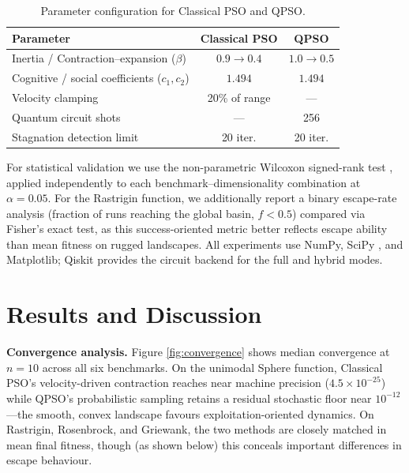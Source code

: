 \documentclass[11pt]{article}
\begin{document}
\begin{table}[h]
\centering
\small
\vspace{-0.3em}
\begin{tabular}{lcc}
\toprule
Parameter & Classical PSO & QPSO \\
\midrule
Inertia / Contraction--expansion ($\beta$) & $0.9 \to 0.4$ & $1.0 \to 0.5$ \\
Cognitive / social coefficients ($c_1, c_2$) & $1.494$ & $1.494$ \\
Velocity clamping & 20\% of range & --- \\
Quantum circuit shots & --- & 256 \\
Stagnation detection limit & 20 iter. & 20 iter. \\
\bottomrule
\end{tabular}
\caption{Parameter configuration for Classical PSO and QPSO.}
\label{tab:params}
\vspace{-0.5em}
\end{table}

For statistical validation we use the non-parametric Wilcoxon signed-rank test \cite{wilcoxon1945,derrac2011}, applied independently to each benchmark--dimensionality combination at $\alpha=0.05$. For the Rastrigin function, we additionally report a binary escape-rate analysis (fraction of runs reaching the global basin, $f<0.5$) compared via Fisher's exact test, as this success-oriented metric better reflects escape ability than mean fitness on rugged landscapes. All experiments use NumPy, SciPy \cite{scipy2020}, and Matplotlib; Qiskit \cite{qiskit2024} provides the circuit backend for the full and hybrid modes.

\vspace{-0.3em}
\section{Results and Discussion}

\textbf{Convergence analysis.} Figure \ref{fig:convergence} shows median convergence at $n=10$ across all six benchmarks. On the unimodal Sphere function, Classical PSO's velocity-driven contraction reaches near machine precision ($4.5\times10^{-25}$) while QPSO's probabilistic sampling retains a residual stochastic floor near $10^{-12}$---the smooth, convex landscape favours exploitation-oriented dynamics. On Rastrigin, Rosenbrock, and Griewank, the two methods are closely matched in mean final fitness, though (as shown below) this conceals important differences in escape behaviour.
\end{document}
